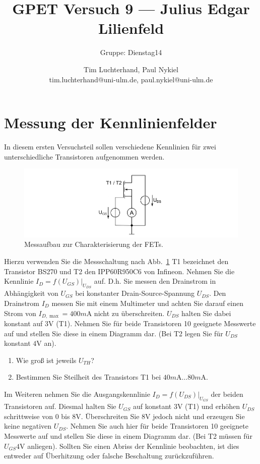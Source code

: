 \documentclass[10pt]{scrreprt}
\author{Tim Luchterhand, Paul Nykiel \protect\\ tim.luchterhand@uni-ulm.de, paul.nykiel@uni-ulm.de}
\title{GPET Versuch 9 --- Julius Edgar Lilienfeld}
\subtitle{Gruppe: Dienstag14}
\begin{document}
    \maketitle
    \section{Messung der Kennlinienfelder}
    In diesem ersten Versuchsteil sollen verschiedene Kennlinien für zwei unterschiedliche
    Transistoren aufgenommen werden.
    \begin{figure}[H]
        \includegraphics[width=\textwidth]{abb12.png}
        \caption{Messaufbau zur Charakterisierung der FETs.}
        \label{fig:abb12}
    \end{figure}
    Hierzu verwenden Sie die Messschaltung nach Abb.~\ref{fig:abb12} T1 bezeichnet den Transistor
    BS270 und T2 den IPP60R950C6 von Infineon.
    \vspace{0.5cm}
    Nehmen Sie die Kennlinie $I_D = f (U_{GS} )\vert_{U_{DS}}$ auf. D.h. Sie messen den Drainstrom in
    Abhängigkeit von $U_{GS}$ bei konstanter Drain-Source-Spannung $U_{DS}$. Den Drainstrom $I_D$
    messen Sie mit einem Multimeter und achten Sie darauf einen Strom von $I_{D,\max} = 400\si{m\ampere}$
    nicht zu überschreiten. $U_{DS}$ halten Sie dabei konstant auf $3\si{\volt}$ (T1).
    Nehmen Sie für beide Transistoren 10 geeignete Messwerte auf und stellen Sie diese in
    einem Diagramm dar. (Bei T2 legen Sie für $U_{DS}$ konstant $4\si{\volt}$ an).

    \begin{enumerate}
        \item Wie groß ist jeweils $U_{TH}$?
        \item Bestimmen Sie Steilheit des Transistors T1 bei $40\si{m\ampere} \ldots 80\si{m\ampere}$.
    \end{enumerate}

    Im Weiteren nehmen Sie die Ausgangskennlinie $I_D = f (U_{DS} )\vert_{U_{GS}}$ der beiden Transistoren
    auf. Diesmal halten Sie $U_{GS}$ auf konstant $3\si{\volt}$ (T1) und erhöhen $U_{DS}$ schrittweise von $0$ bis
    $8\si{\volt}$. Überschreiten Sie $8\si{\volt}$ jedoch nicht und erzeugen Sie keine negativen $U_{DS}$. Nehmen
    Sie auch hier für beide Transistoren 10 geeignete Messwerte auf und stellen Sie diese in
    einem Diagramm dar. (Bei T2 müssen für $U_{GS} 4\si{\volt}$ anliegen). Sollten Sie einen Abriss
    der Kennlinie beobachten, ist dies entweder auf Überhitzung oder falsche Beschaltung
    zurückzuführen.
\end{document}
